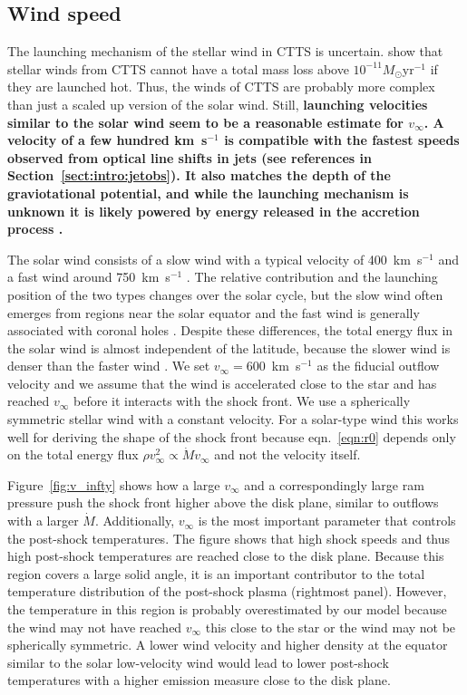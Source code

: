 \subsection{Wind speed}
The launching mechanism of the stellar wind in CTTS is uncertain. \citet{2007IAUS..243..299M} show that stellar winds from CTTS cannot have a total mass loss above $10^{-11}M_\odot\mathrm{ yr}^{-1}$ if they are launched hot. 
Thus, the winds of CTTS are probably more complex than just a scaled up version of the solar wind.
Still, \textbf{launching velocities similar to the solar wind seem to be a reasonable estimate for $v_\infty$. A velocity of a few hundred km~s$^{-1}$ is compatible with the fastest speeds observed from optical line shifts in jets (see references in Section~\ref{sect:intro:jetobs}). It also matches the depth of the graviotational potential, and while the launching mechanism is unknown it is likely powered by energy released in the accretion process \citep{1988ApJ...332L..41K,2005ApJ...632L.135M}.}

The solar wind consists of a slow wind with a typical velocity of 400~km~s$^{-1}$ and a fast wind around 750~km~s$^{-1}$ \citep{2005JGRA..110.7109F}. The relative contribution and the launching position of the two types changes over the solar cycle, but the slow wind often emerges from regions near the solar equator and the fast wind is generally associated with coronal holes \citep{1999GeoRL..26.2901G,2003A&A...408.1165B,2009LRSP....6....3C}. Despite these differences, the total energy flux in the solar wind is almost independent of the latitude, because the slower wind is denser than the faster wind \citep{2012SoPh..279..197L}. We set $v_\infty=600$~km~s$^{-1}$ as the fiducial outflow velocity and we assume that the wind is accelerated close to the star and has reached $v_\infty$ before it interacts with the shock front. We use a spherically symmetric stellar wind with a constant velocity. For a solar-type wind this works well for deriving the shape of the shock front because eqn.~\ref{eqn:r0} depends only on the total energy flux $\rho v^2_\infty \propto \dot M v_\infty$ and not the velocity itself. 

Figure~\ref{fig:v_infty} shows how a large $v_\infty$ and a correspondingly large ram pressure push the shock front higher above the disk plane, similar to outflows with a larger $\dot M$. Additionally, $v_\infty$ is the most important parameter that controls the post-shock temperatures.
The figure shows that high shock speeds and thus high post-shock temperatures are reached close to the disk plane. Because this region covers a large solid angle, it is an important contributor to the total temperature distribution of the post-shock plasma (rightmost panel). However, the temperature in this region is probably overestimated by our model because the wind may not have reached $v_\infty$ this close to the star or the wind may not be spherically symmetric. A lower wind velocity and higher density at the equator similar to the solar low-velocity wind would lead to lower post-shock temperatures with a higher emission measure close to the disk plane.
